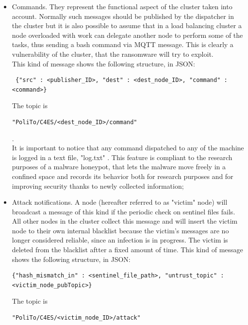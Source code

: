 \begin{itemize}
  \item Commands. They represent the functional aspect of the cluster taken into account. Normally such messages should be published by the dispatcher in the cluster but it is also possible to assume that in a load balancing cluster a node overloaded with work can delegate another node to perform some of the tasks, thus sending a bash command via MQTT message. This is clearly a vulnerability of the cluster, that the ransomware will try to exploit.\\
This kind of message shows the following structure, in JSON: \\ \begin{verbatim} {"src" : <publisher_ID>, "dest" : <dest_node_ID>, "command" : <command>}  \end{verbatim}
The topic is \begin{verbatim}"PoliTo/C4ES/<dest_node_ID>/command"\end{verbatim}.\\
It is important to notice that any command dispatched to any of the machine is logged in a text file, "log.txt" 
. This feature is compliant to the research purposes of a malware honeypot, that lets the malware move freely in a confined space and records its behavior both for research purposes and for improving security thanks to newly collected information;
  \item Attack notifications. A node (hereafter referred to as "victim" node) will broadcast a message of this kind if the periodic check on sentinel files fails. All other nodes in the cluster collect this message and will insert the victim node to their own internal blacklist because the victim's messages are no longer considered reliable, since an infection is in progress. The victim is deleted from the blacklist aftter a fixed amount of time.
This kind of message shows the following structure, in JSON:\\ \begin{verbatim}{"hash_mismatch_in" : <sentinel_file_path>, "untrust_topic" : <victim_node_pubTopic>}\end{verbatim}
 The topic is \begin{verbatim}"PoliTo/C4ES/<victim_node_ID>/attack"\end{verbatim}
\end{itemize}


